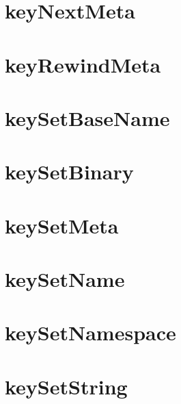 \let\mypdfximage\pdfximage\def\pdfximage{\immediate\mypdfximage}\documentclass[twoside]{book}
\newcommand{\+}{\discretionary{\mbox{\scriptsize$\hookleftarrow$}}{}{}}
\begin{document}
\chapter{key\+Next\+Meta}
\label{doc_contrib_api_reviews_core_keyNextMeta_md}

\chapter{key\+Rewind\+Meta}
\label{doc_contrib_api_reviews_core_keyRewindMeta_md}

\chapter{key\+Set\+Base\+Name}
\label{doc_contrib_api_reviews_core_keySetBaseName_md}

\chapter{key\+Set\+Binary}
\label{doc_contrib_api_reviews_core_keySetBinary_md}

\chapter{key\+Set\+Meta}
\label{doc_contrib_api_reviews_core_keySetMeta_md}

\chapter{key\+Set\+Name}
\label{doc_contrib_api_reviews_core_keySetName_md}

\chapter{key\+Set\+Namespace}
\label{doc_contrib_api_reviews_core_keySetNamespace_md}

\chapter{key\+Set\+String}
\label{doc_contrib_api_reviews_core_keySetString_md}

\end{document}
